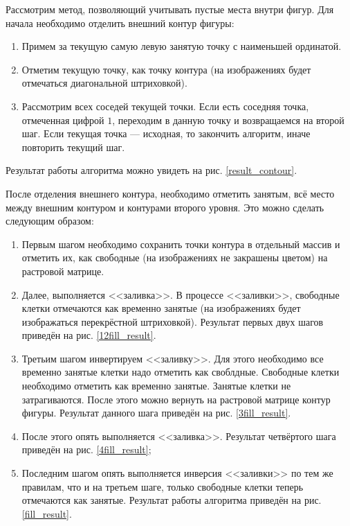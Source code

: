 \documentclass[14pt]{extarticle}
\begin{document}
	Рассмотрим метод, позволяющий учитывать пустые места внутри фигур. Для начала необходимо отделить внешний контур фигуры:
	\begin{enumerate}
		\item Примем за текущую самую левую занятую точку с наименьшей ординатой.
		\item  Отметим текущую точку, как точку контура (на изображениях будет отмечаться диагональной штриховкой).
		\item Рассмотрим всех соседей текущей точки. Если есть соседняя точка, отмеченная цифрой $1$, переходим в данную точку и возвращаемся на второй шаг. Если текущая точка --- исходная, то закончить алгоритм, иначе повторить текущий шаг.
	\end{enumerate}


	Результат работы алгоритма можно увидеть на рис. \ref{result_contour}.
	


	После отделения внешнего контура, необходимо отметить занятым, всё место между внешним контуром и контурами второго уровня. Это можно сделать следующим образом:
	\begin{enumerate}
		\item Первым шагом необходимо сохранить точки контура в отдельный массив и отметить их, как свободные (на изображениях не закрашены цветом) на растровой матрице.
		\item Далее, выполняется <<заливка>>. В процессе <<заливки>>, свободные клетки отмечаются как временно занятые (на изображениях будет изображаться перекрёстной штриховкой). Результат первых двух шагов приведён на рис. \ref{12fill_result}.
		\item\label{3fill_step} Третьим шагом инвертируем <<заливку>>. Для этого необходимо все временно занятые клетки надо отметить как своблдные. Свободные клетки необходимо отметить как временно занятые.
		Занятые клетки не затрагиваются. После этого можно вернуть на растровой матрице контур фигуры. Результат данного шага приведён на рис. \ref{3fill_result}.
		\item После этого опять выполняется <<заливка>>. Результат четвёртого шага приведён на рис. \ref{4fill_result};
		\item Последним шагом опять выполняется инверсия <<заливки>> по тем же правилам, что и на третьем шаге, только свободные клетки теперь отмечаются как занятые. Результат работы алгоритма приведён на рис. \ref{fill_result}.
	\end{enumerate}
	
	
	
	
\end{document}
